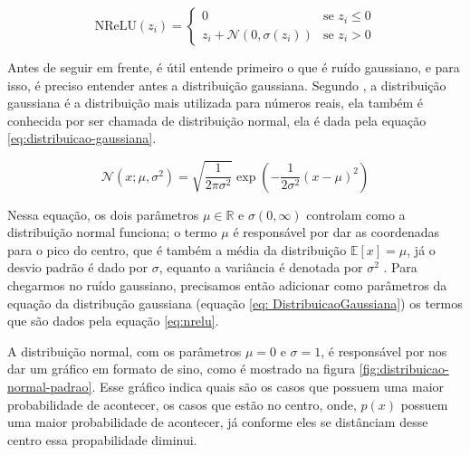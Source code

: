 \begin{equation}
    \text{NReLU}(z_i) = \begin{cases} 
    0 & \text{se } z_i \le 0 \\ 
    z_i + \mathcal{N} (0, \sigma(z_i)) & \text{se } z_i > 0 
    \end{cases}
    \label{eq:nrelu}
\end{equation}

Antes de seguir em frente, é útil entende primeiro o que é ruído gaussiano, e para isso, é preciso entender antes a distribuição gaussiana. Segundo \textcite{DeepLearningBook}, a distribuição gaussiana é a distribuição mais utilizada para números reais, ela também é conhecida por ser chamada de distribuição normal, ela é dada pela equação \ref{eq:distribuicao-gaussiana}.

\begin{equation}
    \mathcal{N}(x; \mu, \sigma^2) = \sqrt{\frac{1}{2\pi\sigma^2}} \exp\left( -\frac{1}{2\sigma^2}(x - \mu)^2 \right)
    \label{eq:distribuicao-gaussiana}
\end{equation}

Nessa equação, os dois parâmetros $\mu \in \mathbb{R}$ e $\sigma (0, \infty)$ controlam como a distribuição normal funciona; o termo $\mu$ é responsável por dar as coordenadas para o pico do centro, que é também a média da distribuição $\mathbb{E}[x] = \mu$, já o desvio padrão é dado por $\sigma$, equanto a variância é denotada por $\sigma^2$ \parencite{DeepLearningBook}. Para chegarmos no ruído gaussiano, precisamos então adicionar como parâmetros da equação da distribução gaussiana (equação \ref{eq: DistribuicaoGaussiana}) os termos que são dados pela equação \ref{eq:nrelu}. 

A distribuição normal, com os parâmetros $\mu = 0$ e $\sigma=1$, é responsável por nos dar um gráfico em formato de sino, como é mostrado na figura \ref{fig:distribuicao-normal-padrao}. Esse gráfico indica quais são os casos que possuem uma maior probabilidade de acontecer, os casos que estão no centro, onde, $p(x)$ possuem uma maior probabilidade de acontecer, já conforme eles se distânciam desse centro essa propabilidade diminui.

